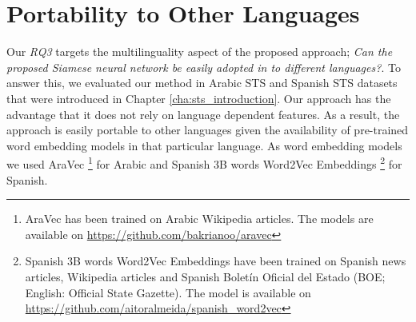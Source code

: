 \section{Portability to Other Languages}
\label{sec:siamese_languages}
Our \textit{RQ3} targets the multilinguality aspect of the proposed approach; \textit{Can the proposed Siamese neural network be easily adopted in to different languages?}. To answer this, we evaluated our method in Arabic STS and Spanish STS datasets that were introduced in Chapter \ref{cha:sts_introduction}. Our approach has the advantage that it does not rely on language dependent features.  As a result, the approach is easily portable to other languages given the availability of pre-trained word embedding models in that particular language. As word embedding models we used AraVec \cite{SOLIMAN2017256} \footnote{AraVec has been trained on Arabic Wikipedia articles. The models are available on \url{https://github.com/bakrianoo/aravec}} for Arabic and Spanish 3B words Word2Vec Embeddings \cite{doi:10.1177/1550147718811827}\footnote{Spanish 3B words Word2Vec Embeddings have been trained on Spanish news articles, Wikipedia articles and Spanish Boletín Oficial del Estado (BOE; English: Official State Gazette). The model is available on \url{https://github.com/aitoralmeida/spanish_word2vec}} for Spanish.


\begin{table}[htb]
	\centering
	\caption[Results for Arabic STS with Siamese Neural Network]{Results for Arabic STS dataset with different variants of Siamese Neural Network. For each variant, Pearson Correlation ($\bm{\rho}$) and Spearman Correlation ($\bm{\tau}$) are reported between the predicted values and the gold labels of the test set. Best result from all the variations is marked with ${\dagger}$. }  
	\label{tab:arabic_siamese}
\end{table}


